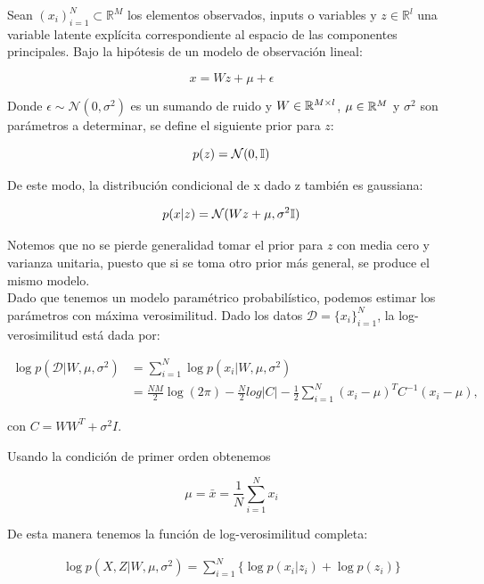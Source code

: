 Sean $(x_i)_{i=1}^N\subset \mathbb{R}^M$ los elementos observados, inputs o variables y $z\in \mathbb{R}^l$ una variable latente explícita correspondiente al espacio de las componentes principales. Bajo la hipótesis de un modelo de observación lineal:

\begin{equation}
	x=Wz+\mu+\epsilon
\end{equation}

Donde $\epsilon\sim\mathcal{N}(0,\sigma^2)$ es un sumando de ruido y $W\in \mathbb{R}^{M\times l}$, $\mu \in \mathbb{R}^M$ y $\sigma^2$ son parámetros a determinar, se define el siguiente prior para $z$:

\begin{equation}
p(z) = \mathcal{N}(0,{\mathbb I})
\end{equation}

De este modo, la distribución condicional de x dado z también es gaussiana:

\begin{equation}
p(x|z) = \mathcal{N}(Wz+\mu,\sigma^2{\mathbb I})
\end{equation}

Notemos que no se pierde generalidad tomar el prior para $z$ con media cero y varianza unitaria, puesto que si se toma otro prior más general, se produce el mismo modelo.\\


Dado que tenemos un modelo paramétrico probabilístico, podemos estimar los parámetros con máxima verosimilitud. Dado los datos $\mathcal{D} = \{x_i\}_{i=1}^N$, la log-verosimilitud está dada por:

\begin{align}
\log p(\mathcal{D}|W,\mu, \sigma^2) & = \sum_{i=1}^N \log p(x_i|W,\mu, \sigma^2)\\
& = \frac{NM}{2}\log (2\pi) - \frac{N}{2}log|C| - \frac{1}{2}\sum_{i=1}^N (x_i-\mu)^T C^{-1} (x_i-\mu),
\end{align}

con $C = WW^T + \sigma^2 I$.

Usando la condición de primer orden obtenemos

\begin{equation}
	\mu = \bar{x} = \frac{1}{N}\sum_{i=1}^N x_i
\end{equation}

De esta manera tenemos la función de log-verosimilitud completa:

\begin{align}
    \log p(X, Z|W, \mu, \sigma^2) = \sum_{i=1}^N \{\log p(x_i|z_i) + \log p(z_i)\}
\end{align}

